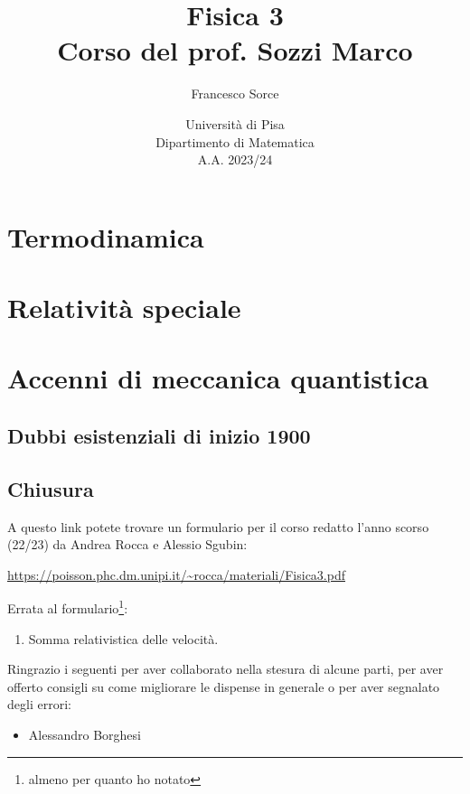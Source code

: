\documentclass[a4paper]{report}
\title{Fisica 3\\
\large Corso del prof. Sozzi Marco}
\author{Francesco Sorce}
\date{Università di Pisa\\
Dipartimento di Matematica\\
A.A. 2023/24}
\begin{document}
\maketitle

\tableofcontents
\newpage


\part{Termodinamica}








\part{Relativit\`a speciale}




\part{Accenni di meccanica quantistica}
\chapter{Dubbi esistenziali di inizio 1900}

















\appendix


\chapter{Chiusura}
A questo link potete trovare un formulario per il corso redatto l'anno scorso (22/23) da Andrea Rocca e Alessio Sgubin:
\begin{center}
\url{https://poisson.phc.dm.unipi.it/~rocca/materiali/Fisica3.pdf}
\end{center}

\bigskip 

\noindent Errata al formulario\footnote{almeno per quanto ho notato}:
\begin{enumerate}
\item Somma relativistica delle velocit\`a.
\end{enumerate}


\newpage
\noindent
Ringrazio i seguenti per aver collaborato nella stesura di alcune parti, per aver offerto consigli su come migliorare le dispense in generale o per aver segnalato degli errori:
\begin{itemize}
\item Alessandro Borghesi
\end{itemize}
\end{document}

